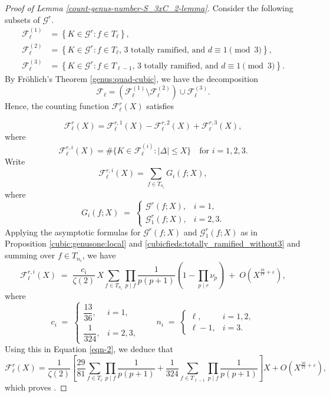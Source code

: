 \documentclass[11pt,reqno]{amsart}
\newcommand{\cF}{\mathcal{F}}
\newcommand{\cG}{\mathcal{G}}
\theoremstyle{definition}
\theoremstyle{remark}
\begin{document}
\begin{proof}[Proof of Lemma \ref{count-genus-number-S_3xC_2-lemma}]
Consider the following subsets of $ \cG^r $.
\[
\begin{aligned}
\mathcal{F}_{\ell}^{(1)} &= \left\{ K \in \cG^r : f \in T_{\ell} \right\}, \\
\mathcal{F}_{\ell}^{(2)} &= \left\{ K \in \cG^r : f \in T_{\ell},\, 3 \text{ totally ramified, and } d \equiv 1 \pmod{3} \right\}, \\
\mathcal{F}_{\ell}^{(3)} &= \left\{ K \in \cG^r : f \in T_{\ell-1},\, 3 \text{ totally ramified, and } d \equiv 1 \pmod{3} \right\}.
\end{aligned}
\]
By Fr\"ohlich's Theorem \ref{genus:quad-cubic}, we have the decomposition
\[
\mathcal{F}_{\ell} = \left(\mathcal{F}_{\ell}^{(1)} \setminus \mathcal{F}_{\ell}^{(2)}\right) \cup \mathcal{F}_{\ell}^{(3)}.
\]
Hence, the counting function $ \cF_{\ell}^r(X) $ satisfies

\begin{equation}\label{eqn-2}
\cF_{\ell}^r(X) = \cF_{\ell}^{r,1}(X) - \cF_{\ell}^{r,2}(X) + \cF_{\ell}^{r,3}(X),
\end{equation}
where 
\[
\cF_{\ell}^{r,i}(X) = \#\{ K \in \mathcal{F}_{\ell}^{(i)} : |\Delta| \leq X \} \quad \text{for } i = 1,2,3.
\]
Write
\[
\cF_{\ell}^{r,i}(X) 
= \sum_{f \in T_{n_i}} G_i(f; X),
\]
where
\[
G_i(f; X) \;=\;
\begin{cases}
    \cG^{r}(f; X), & i = 1, \\[6pt]
    \cG_1^{r}(f; X), & i = 2,3.
\end{cases}
\]
Applying the asymptotic formulas for $\cG^{r}(f; X)$ and $\cG_1^{r}(f; X)$ as in Proposition \ref{cubic:genusone:local} and \ref{cubicfieds:totally_ramified_without3} and summing over $f \in T_{n_i}$, we have
\[
\cF_{\ell}^{r,i}(X) \;=\; \frac{c_i}{\zeta(2)} \, X 
\sum_{f \in T_{n_i}} \prod_{p \mid f} \frac{1}{p(p+1)} 
\left(1 - \prod_{p \mid r} \nu_p\right) 
\;+\; O\!\left(X^{\tfrac{16}{17}+\varepsilon}\right),
\]
where
\[
c_i \;=\; 
\begin{cases}
    \dfrac{13}{36}, & i = 1, \\[6pt]
    \dfrac{1}{324}, & i = 2,3,
\end{cases}
\qquad
n_i \;=\;
\begin{cases}
    \ell, & i = 1,2, \\[6pt]
    \ell - 1, & i = 3.
\end{cases}
\]
Using this in Equation \eqref{eqn-2}, we deduce that
\[
\cF_{\ell}^r(X) = \frac{1}{\zeta(2)} \left[ \frac{29}{81} \sum_{f \in T_{\ell}} \prod_{p \mid f} \frac{1}{p(p+1)} + \frac{1}{324} \sum_{f \in T_{\ell-1}} \prod_{p \mid f} \frac{1}{p(p+1)} \right] X + O\left(X^{\frac{16}{17} + \varepsilon}\right),
\]
which proves .
\end{proof}
\end{document}
